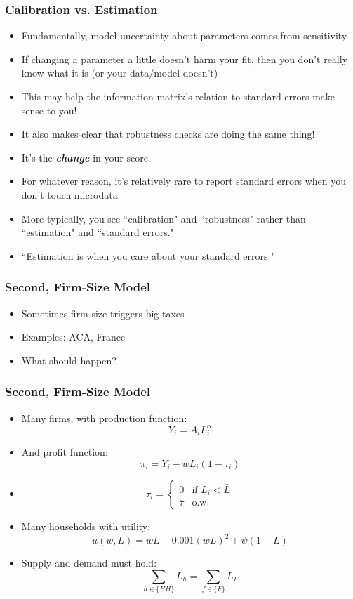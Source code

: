 \documentclass{beamer}
\begin{document}
\begin{frame}
\frametitle{Calibration vs. Estimation}
\begin{itemize}
\item Fundamentally, model uncertainty about parameters comes from sensitivity
\smallskip
\item If changing a parameter a little doesn't harm your fit, then you don't really know what it is (or your data/model doesn't)
\smallskip
\item This may help the information matrix's relation to standard errors make sense to you!  
\smallskip 
\item<2-> It also makes clear that robustness checks are doing the same thing!
\smallskip
\item<3-> It's the \textbf{\emph{change}} in your score.
\smallskip
\item<4-> For whatever reason, it's relatively rare to report standard errors when you don't touch microdata
\smallskip
\item<4->  More typically, you see ``calibration" and ``robustness" rather than ``estimation" and ``standard errors."
\smallskip
\item<4->  ``Estimation is when you care about your standard errors."
\end{itemize}
\end{frame}

\begin{frame}
\frametitle{Second, Firm-Size Model}
\begin{itemize}
\item Sometimes firm size triggers big taxes
\bigskip
\item Examples: ACA, France
\bigskip
\item What should happen?
\end{itemize}
\end{frame}

\begin{frame}
\frametitle{Second, Firm-Size Model}
\begin{itemize}
\item Many firms, with production function:
$$Y_i=A_iL_i^\alpha$$
\item And profit function:
$$\pi_i=Y_i-wL_i(1-\tau_i)$$
\item $$\tau_i=\begin{cases} 0 & \text{if $L_i<\bar{L}$} \\ \overline{\tau} & \text{o.w.}\end{cases}$$
\item Many households with utility:
$$u(w,L)=wL-0.001(wL)^2+\psi(1-L)$$
\item Supply and demand must hold:
$$\sum_{h\in \{HH\}}L_h=\sum_{f\in\{F\}}L_F$$\end{itemize}
\end{frame}
\end{document}
